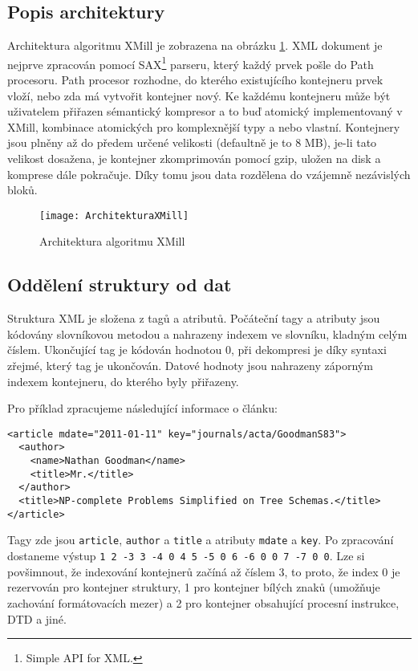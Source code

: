 \subsection{Popis architektury}
Architektura algoritmu XMill je zobrazena na obrázku \ref{architekturaXMill}. XML dokument je nejprve zpracován pomocí SAX\footnote{Simple API for XML.} parseru, který každý prvek pošle do Path procesoru. Path procesor rozhodne, do kterého existujícího kontejneru prvek vloží, nebo zda má vytvořit kontejner nový. Ke každému kontejneru může být uživatelem přiřazen sémantický kompresor a to buď atomický implementovaný v XMill, kombinace atomických pro komplexnější typy a nebo vlastní. Kontejnery jsou plněny až do předem určené velikosti (defaultně je to 8 MB), je-li tato velikost dosažena, je kontejner zkomprimován pomocí gzip, uložen na disk a komprese dále pokračuje. Díky tomu jsou data rozdělena do vzájemně nezávislých bloků.

\begin{figure}[!htb]
\centering
\texttt{[image: ArchitekturaXMill]}
\caption{Architektura algoritmu XMill \cite{xmill}}
\label{architekturaXMill}
\end{figure}

\subsection{Oddělení struktury od dat}
\label{xmillOddeleniStruktury}
Struktura XML je složena z tagů a atributů. Počáteční tagy a atributy jsou kódovány slovníkovou metodou a nahrazeny indexem ve slovníku, kladným celým číslem. Ukončující tag je kódován hodnotou 0, při dekompresi je díky syntaxi zřejmé, který tag je ukončován. Datové hodnoty jsou nahrazeny záporným indexem kontejneru, do kterého byly přiřazeny. \cite{xmill}

Pro příklad zpracujeme následující informace o článku:

\begin{verbatim}
<article mdate="2011-01-11" key="journals/acta/GoodmanS83">
  <author>
    <name>Nathan Goodman</name>
    <title>Mr.</title>
  </author>
  <title>NP-complete Problems Simplified on Tree Schemas.</title>
</article>
\end{verbatim}

Tagy zde jsou \texttt{article}, \texttt{author} a \texttt{title} a atributy \texttt{mdate} a \texttt{key}. Po zpracování dostaneme výstup \texttt{1 2 -3 3 -4 0 4 5 -5 0 6 -6 0 0 7 -7 0 0}. Lze si povšimnout, že indexování kontejnerů začíná až číslem 3, to proto, že index 0 je rezervován pro kontejner struktury, 1 pro kontejner bílých znaků (umožňuje zachování formátovacích mezer) a 2 pro kontejner obsahující procesní instrukce, DTD a jiné.

